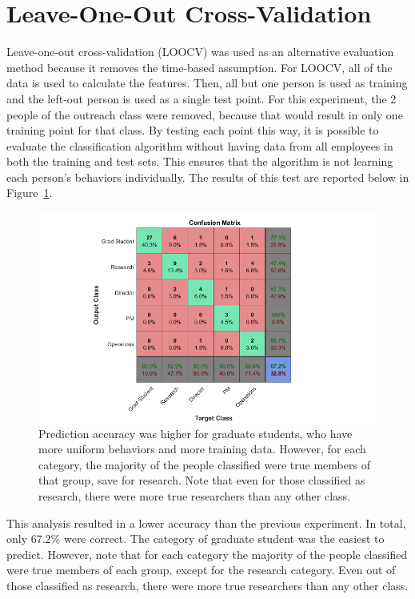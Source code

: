 \documentclass[12pt]{report}
\begin{document}
\section{Leave-One-Out Cross-Validation}
Leave-one-out cross-validation (LOOCV) was used as an alternative evaluation method because it removes the time-based assumption.
For LOOCV, all of the data is used to calculate the features.
Then, all but one person is used as training and the left-out person is used as a single test point.
For this experiment, the 2 people of the outreach class were removed, because that would result in only one training point for that class.
By testing each point this way, it is possible to evaluate the classification algorithm without having data from all employees in both the training and test sets.
This ensures that the algorithm is not learning each person's behaviors individually.
The results of this test are reported below in Figure~\ref{fig:loocv_conf_plot}.
\begin{figure}[t]
    \centering
        \includegraphics[width=.9\columnwidth,trim={1mm 4mm 1mm 3.5mm},clip]{confusion_plot}
        \vspace{-7pt}
        \caption[Leave one out cross validation results]{Prediction accuracy was higher for graduate students, who have more uniform behaviors and more training data.  However, for each category, the majority of the people classified were true members of that group, save for research.  Note that even for those classified as research, there were more true researchers than any other class.}
        \label{fig:loocv_conf_plot}
\end{figure}

This analysis resulted in a lower accuracy than the previous experiment.
In total, only 67.2\% were correct.
The category of graduate student was the easiest to predict.
However, note that for each category the majority of the people classified were true members of each group, except for the research category.
Even out of those classified as research, there were more true researchers than any other class.
\end{document}
